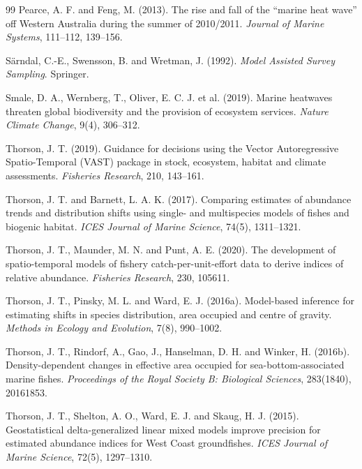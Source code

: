 \documentclass[11pt,a4paper]{article}
\begin{document}
\begin{thebibliography}{99}
Pearce, A. F. and Feng, M. (2013). The rise and fall of the ``marine heat wave'' off Western Australia during the summer of 2010/2011. \textit{Journal of Marine Systems}, 111--112, 139--156.

S\"arndal, C.-E., Swensson, B. and Wretman, J. (1992). \textit{Model Assisted Survey Sampling}. Springer.

Smale, D. A., Wernberg, T., Oliver, E. C. J. et al. (2019). Marine heatwaves threaten global biodiversity and the provision of ecosystem services. \textit{Nature Climate Change}, 9(4), 306--312.

Thorson, J. T. (2019). Guidance for decisions using the Vector Autoregressive Spatio-Temporal (VAST) package in stock, ecosystem, habitat and climate assessments. \textit{Fisheries Research}, 210, 143--161.

Thorson, J. T. and Barnett, L. A. K. (2017). Comparing estimates of abundance trends and distribution shifts using single- and multispecies models of fishes and biogenic habitat. \textit{ICES Journal of Marine Science}, 74(5), 1311--1321.

Thorson, J. T., Maunder, M. N. and Punt, A. E. (2020). The development of spatio-temporal models of fishery catch-per-unit-effort data to derive indices of relative abundance. \textit{Fisheries Research}, 230, 105611.

Thorson, J. T., Pinsky, M. L. and Ward, E. J. (2016a). Model-based inference for estimating shifts in species distribution, area occupied and centre of gravity. \textit{Methods in Ecology and Evolution}, 7(8), 990--1002.

Thorson, J. T., Rindorf, A., Gao, J., Hanselman, D. H. and Winker, H. (2016b). Density-dependent changes in effective area occupied for sea-bottom-associated marine fishes. \textit{Proceedings of the Royal Society B: Biological Sciences}, 283(1840), 20161853.

Thorson, J. T., Shelton, A. O., Ward, E. J. and Skaug, H. J. (2015). Geostatistical delta-generalized linear mixed models improve precision for estimated abundance indices for West Coast groundfishes. \textit{ICES Journal of Marine Science}, 72(5), 1297--1310.


\end{thebibliography}
\end{document}
